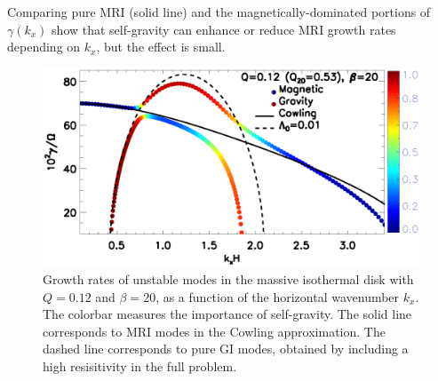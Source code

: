 %

Comparing pure MRI (solid line) and the magnetically-dominated
portions of $\gamma(k_x)$ show that self-gravity can enhance or reduce
MRI growth rates depending on $k_x$, but the effect is small. 


\begin{figure}
  \includegraphics[width=\linewidth]{figures/compare_growth3_Q0d12_B20.ps}  
  \caption{Growth rates of unstable modes in the massive isothermal
    disk with $Q=0.12$ and $\beta=20$, as a function of the horizontal
    wavenumber $k_x$. The colorbar measures the importance of
    self-gravity. The solid line corresponds to MRI modes in the
    Cowling approximation. The dashed line corresponds to pure GI
    modes, obtained by including a high resisitivity in the full problem. 
    \label{compare_growth3_Q01d2}}
\end{figure}




